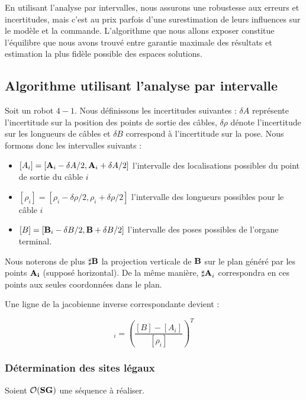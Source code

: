 En utilisant l'analyse par intervalles, nous assurons une robustesse aux 
erreurs et incertitudes, mais c'est au prix parfois d'une surestimation de 
leurs influences sur le mod\`ele et la commande. L'algorithme que nous allons 
exposer constitue l'\'equilibre que nous avons trouv\'e entre garantie maximale 
des r\'esultats et estimation la plus fid\`ele possible des espaces solutions.

\subsection{Algorithme utilisant l'analyse par intervalle}

Soit un robot $4-1$. Nous d\'efinissons les incertitudes suivantes : $\delta A$ 
repr\'esente l'incertitude sur la position des points de sortie des c\^ables, 
$\delta \rho$ d\'enote l'incertitude sur les longueurs de c\^ables et $\delta 
B$ correspond \`a l'incertitude sur la pose. Nous formons donc les intervalles 
suivants :
\begin{itemize}
 \item $[A_i] = [{\bf A}_i - \delta A/2,{\bf A}_i + \delta A/2]$ l'intervalle 
des localisations possibles du point de sortie du c\^able $i$
  \item $[\rho_i] = [\rho_i - \delta \rho /2,\rho_i + \delta \rho/2]$ 
l'intervalle des longueurs possibles pour le c\^able $i$
  \item $[B] = [{\bf B}_i - \delta B /2,{\bf B} + \delta B/2]$ l'intervalle 
des poses possibles de l'organe terminal.
\end{itemize}

Nous noterons de plus ${\bf \sharp B}$ la projection verticale de $\bf B$ sur 
le plan g\'en\'er\'e par les points ${\bf A_i}$ (suppos\'e horizontal). De la 
m\^eme mani\`ere, ${\bf \sharp A}_i$ correspondra en ces points aux seules 
coordonn\'ees dans le plan.

Une ligne de la jacobienne inverse correspondante devient :

\begin{equation}
[J^{-1}]_i = \left ( \frac {[B] - [A_i]}{[\rho_i]} \right )^T
\label{chap03:eq14}
\end{equation}

\subsubsection{D\'etermination des sites l\'egaux}

Soient $\mathcal O({\bf S}{\bf G})$ une s\'equence \`a r\'ealiser.

